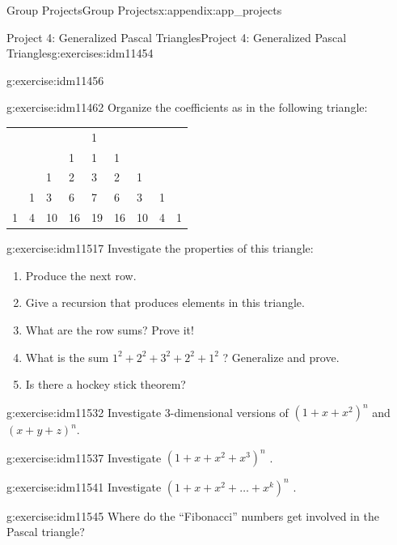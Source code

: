 \documentclass[oneside,10pt,]{book}
\numberwithin{equation}{chapter}
\begin{document}
\begin{appendixptx}{Group Projects}{}{Group Projects}{}{}{x:appendix:app_projects}
\begin{exercises-section-numberless}{Project 4: Generalized Pascal Triangles}{}{Project 4: Generalized Pascal Triangles}{}{}{g:exercises:idm11454}
\begin{divisionexercise}{1}{}{}{g:exercise:idm11456}
\end{divisionexercise}%
\begin{divisionexercise}{2}{}{}{g:exercise:idm11462}%
Organize the coefficients as in the following triangle:%
\begin{sidebyside}{1}{0.1}{0.1}{0}%
\begin{sbspanel}{0.8}%
{\centering%
\begin{tabular}{lllllllll}
&&&&1&&&&\tabularnewline[0pt]
&&&1&1&1&&&\tabularnewline[0pt]
&&1&2&3&2&1&&\tabularnewline[0pt]
&1&3&6&7&6&3&1&\tabularnewline[0pt]
1&4&10&16&19&16&10&4&1
\end{tabular}
\par}
\end{sbspanel}%
\end{sidebyside}%
\end{divisionexercise}%
\begin{divisionexercise}{3}{}{}{g:exercise:idm11517}%
Investigate the properties of this triangle:%
\begin{enumerate}[label=(\alph*)]
\item{}Produce the next row.%
\item{}Give a recursion that produces elements in this triangle.%
\item{}What are the row sums? Prove it!%
\item{}What is the sum \(1^{2} + 2^{2} + 3^{2} + 2^{2} + 1^{2}\) ? Generalize and prove.%
\item{}Is there a hockey stick theorem?%
\end{enumerate}
%
\end{divisionexercise}%
\begin{divisionexercise}{4}{}{}{g:exercise:idm11532}%
Investigate 3-dimensional versions of \(\left( 1 + x + x^{2} \right)^{n}\) and \(\left( x + y + z \right)^{n}.\)%
\end{divisionexercise}%
\begin{divisionexercise}{5}{}{}{g:exercise:idm11537}%
Investigate \(\left( 1 + x + x^{2} + x^{3} \right)^{n}\) .%
\end{divisionexercise}%
\begin{divisionexercise}{6}{}{}{g:exercise:idm11541}%
Investigate \(\left( 1 + x + x^{2} + \ldots + x^{k} \right)^{n}\) .%
\end{divisionexercise}%
\begin{divisionexercise}{7}{}{}{g:exercise:idm11545}%
Where do the ``Fibonacci'' numbers get involved in the Pascal triangle?%
\end{divisionexercise}%

\end{exercises-section-numberless}
\end{appendixptx}
\end{document}
